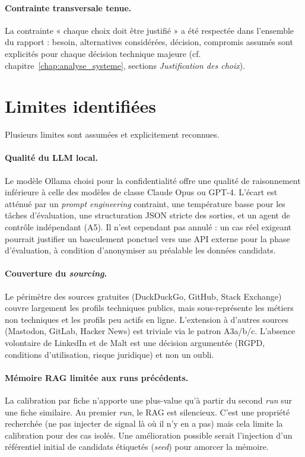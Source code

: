 \paragraph{Contrainte transversale tenue.}
La contrainte « chaque choix doit être justifié » a été respectée dans l'ensemble du rapport : besoin, alternatives considérées, décision, compromis assumés sont explicités pour chaque décision technique majeure (cf. chapitre~\ref{chap:analyse_systeme}, sections \emph{Justification des choix}).

\section{Limites identifiées}

Plusieurs limites sont assumées et explicitement reconnues.

\paragraph{Qualité du LLM local.}
Le modèle Ollama choisi pour la confidentialité offre une qualité de raisonnement inférieure à celle des modèles de classe Claude Opus ou GPT-4. L'écart est atténué par un \emph{prompt engineering} contraint, une température basse pour les tâches d'évaluation, une structuration JSON stricte des sorties, et un agent de contrôle indépendant (A5). Il n'est cependant pas annulé : un cas réel exigeant pourrait justifier un basculement ponctuel vers une API externe pour la phase d'évaluation, à condition d'anonymiser au préalable les données candidats.

\paragraph{Couverture du \emph{sourcing}.}
Le périmètre des sources gratuites (DuckDuckGo, GitHub, Stack Exchange) couvre largement les profils techniques publics, mais sous-représente les métiers non techniques et les profils peu actifs en ligne. L'extension à d'autres sources (Mastodon, GitLab, Hacker News) est triviale via le patron A3a/b/c. L'absence volontaire de LinkedIn et de Malt est une décision argumentée (RGPD, conditions d'utilisation, risque juridique) et non un oubli.

\paragraph{Mémoire RAG limitée aux runs précédents.}
La calibration par fiche n'apporte une plus-value qu'à partir du second \emph{run} sur une fiche similaire. Au premier \emph{run}, le RAG est silencieux. C'est une propriété recherchée (ne pas injecter de signal là où il n'y en a pas) mais cela limite la calibration pour des cas isolés. Une amélioration possible serait l'injection d'un référentiel initial de candidats étiquetés (\emph{seed}) pour amorcer la mémoire.

